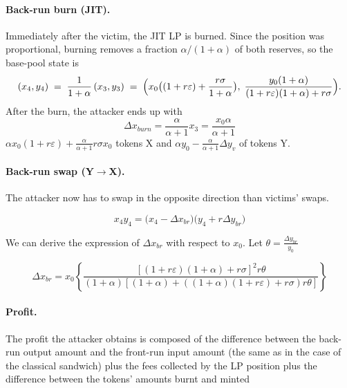 \documentclass[a4paper,11pt]{article}
\begin{document}
\paragraph{Back-run burn (JIT).}
Immediately after the victim, the JIT LP is burned. Since the position was proportional, burning removes a fraction $\alpha/(1+\alpha)$ of both reserves, so the base-pool state is
\begin{equation}
  (x_4,y_4) \;=\; \frac{1}{1+\alpha}\,(x_3,y_3)
 \;=\; \Bigl(x_0\bigl((1+r\varepsilon)+\frac{r\sigma}{1+\alpha}\bigr),\;
             \frac{y_0(1+\alpha)}{(1+r\varepsilon)(1+\alpha)+r\sigma}\Bigr).
  \label{eq:mix_state_after_burn}
\end{equation}
After the burn, the attacker ends up with 
\begin{equation}
    \Delta x_{burn} = \frac{\alpha}{\alpha + 1} x_3 = \frac{x_0\alpha}{\alpha + 1}
\end{equation}
$\alpha x_0(1+r\varepsilon) + \frac{\alpha}{\alpha +1}r \sigma x_0$ tokens X and $\alpha y_0 - \frac{\alpha}{\alpha +1}\Delta y_v$ of tokens Y.

\paragraph{Back-run swap (Y$\to$X).}
The attacker now has to swap in the opposite direction than victims' swaps. 

\begin{equation}
    x_4 y_4 = \bigl( x_4 - \Delta x_{br}\bigr)\bigl(y_4 + r\Delta y_{br}\bigr)
\end{equation}

We can derive the expression of $\Delta x_{br}$ with respect to $x_0$. Let $\theta = \frac{\Delta y_{br}}{y_0}$

\begin{equation}
\Delta x_{br} = x_0 \left\{\frac{\left[(1+r\varepsilon)(1+\alpha) + r\sigma\right]^2r\theta}{(1+\alpha)\left[(1+\alpha) + \left((1+\alpha)(1+r\varepsilon)+r\sigma\right)r\theta\right]} \right\}
\end{equation}

\paragraph{Profit.} The profit the attacker obtains is composed of the difference between the back-run output amount and the front-run input amount (the same as in the case of the classical sandwich) plus the fees collected by the LP position plus the difference between the tokens' amounts burnt and minted
\end{document}
